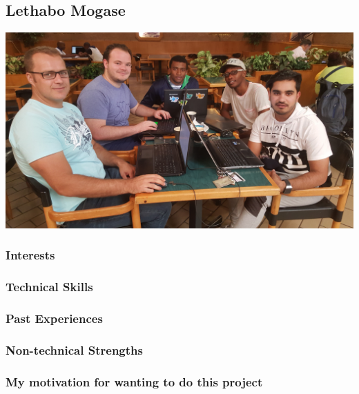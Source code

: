 \documentclass[a4paper,12pt]{article}
\begin{document}
		\subsection{Lethabo Mogase}
		\includegraphics[width=1\textwidth]{./Pictures/the_group.jpg}\\
			\subsubsection{Interests}
			
			\subsubsection{Technical Skills}
			
			\subsubsection{Past Experiences}
			
			\subsubsection{Non-technical Strengths}
			
			\subsubsection{My motivation for wanting to do this project}
		
		\newpage
\end{document}
